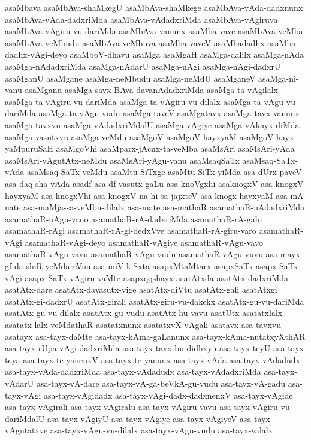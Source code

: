 {asaMbava
asaMbAva-shaMkegU
asaMbAva-shaMkege
asaMbAva-vAda-dadxnunx
asaMbAva-vAda-dadxriMda
asaMbAva-vAdadxriMda
asaMbAva-vAgiruva
asaMbAva-vAgiru-vu-dariMda
asaMbAva-vanunx
asaMba-vave
asaMbAva-veMba
asaMbAva-veMbudu
asaMbAva-veMbuva
asaMba-vaveV
asaMbadadhx
asaMba-dadhx-vAgi-deyo
asaMboV-dhavu
asaMga
asaMgaH
asaMga-dalilx
asaMga-nAda
asaMga-nAdadxriMda
asaMga-nAdarU
asaMga-nAgi
asaMga-nAgi-dadxrU
asaMganU
asaMgane
asaMga-neMbudu
asaMga-neMdU
asaMganeV
asaMga-ni-vanu
asaMganu
asaMga-savx-BAva-davanAdadxriMda
asaMga-ta-vAgilalx
asaMga-ta-vAgiru-vu-dariMda
asaMga-ta-vAgiru-vu-dilalx
asaMga-ta-vAgu-vu-dariMda
asaMga-ta-vAgu-vudu
asaMga-taveV
asaMgatavx
asaMga-tavx-vanunx
asaMga-tavxvu
asaMga-vAdadxriMdalU
asaMga-vAgiye
asaMga-vAkayx-diMda
asaMga-vasutxvu
asaMga-veMdu
asaMgoV
asaMgoV-hayxyaM
asaMgoV-hayx-yaMpuruSaH
asaMgoVhi
asaMparx-jAcnx-ta-veMba
asaMsAri
asaMsAri-yAda
asaMsAri-yAgutAtx-neMdu
asaMsAri-yAgu-vanu
asaMsaqSaTx
asaMsaq-SaTx-vAda
asaMsaq-SaTx-veMdu
asaMtu-SiTxge
asaMtu-SiTx-yiMda
asa-dUrx-paveV
asa-daq-sha-vAda
asadf
asa-df-vasutx-gaLu
asa-knoVgxhi
asaknogxV
asa-knogxV-hayxyaM
asa-knogxVhi
asa-knogxV-na-hi-sa-jajxteV
asa-knogx-hayxyaM
asa-mA-nate
asa-maMja-sa-veMbu-dilalx
asa-mate
asa-mathaR
asamathaR-nAdadxriMda
asamathaR-nAgu-vano
asamathaR-rA-dadxriMda
asamathaR-rA-galu
asamathaR-rAgi
asamathaR-rA-gi-dedxVve
asamathaR-rA-giru-varo
asamathaR-vAgi
asamathaR-vAgi-deyo
asamathaR-vAgive
asamathaR-vAgu-vavo
asamathaR-vAgu-vavu
asamathaR-vAgu-vudu
asamathaR-vAgu-vuvu
asa-mayx-gf-da-shiR-yeMdareVnu
asa-miV-kiSxta
asapxMtaMtarx
asapxSaTx
asapx-SaTx-vAgi
asapx-SaTx-vAgiru-vaMte
asapxqqshayx
asatAtxda
asatAtx-dadxriMda
asatAtx-dare
asatAtx-davasutx-vige
asatAtx-diVtu
asatAtx-gali
asatAtxgi
asatAtx-gi-dadxrU
asatAtx-girali
asatAtx-giru-vu-dakekx
asatAtx-gu-vu-dariMda
asatAtx-gu-vu-dilalx
asatAtx-gu-vudu
asatAtx-hu-vavu
asatUtx
asatatxlalx
asatatx-lalx-veMdathaR
asatatxnunx
asatatxvX-vAgali
asatavx
asa-tavxvu
asatayx
asa-tayx-daMte
asa-tayx-kAma-gaLanunx
asa-tayx-kAma-nutatxyXthAR
asa-tayx-rUpa-vAgi-dadxriMda
asa-tayx-tavx-bu-didhxyu
asa-tayx-teyU
asa-tayx-teya
asa-tayx-te-yanenxV
asa-tayx-te-yanunx
asa-tayx-vAda
asa-tayx-vAdadudx
asa-tayx-vAda-dadxriMda
asa-tayx-vAdadudx
asa-tayx-vAdadxriMda
asa-tayx-vAdarU
asa-tayx-vA-dare
asa-tayx-vA-ga-beVkA-gu-vudu
asa-tayx-vA-gadu
asa-tayx-vAgi
asa-tayx-vAgidadx
asa-tayx-vAgi-dadx-dadxnenxV
asa-tayx-vAgide
asa-tayx-vAgirali
asa-tayx-vAgiralu
asa-tayx-vAgiru-vavu
asa-tayx-vAgiru-vu-dariMdalU
asa-tayx-vAgiyU
asa-tayx-vAgiye
asa-tayx-vAgiyeV
asa-tayx-vAgutatxve
asa-tayx-vAgu-vu-dilalx
asa-tayx-vAgu-vudu
asa-tayx-valalx
}
